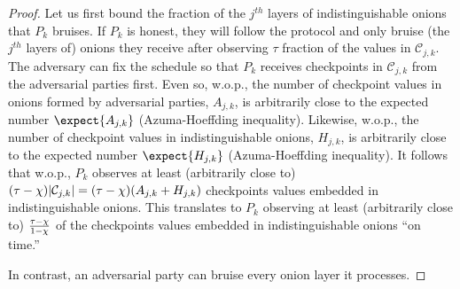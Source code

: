 \documentclass[runningheads,a4paper]{llncs}
\begin{document}
\begin{proof}
Let us first bound the fraction of the $j^\mathit{th}$ layers of indistinguishable onions that $P_k$ bruises. 
If $P_k$ is honest, they will follow the protocol and only bruise (the $j^\mathit{th}$ layers of) onions they receive after observing $\tau$ fraction of the values in $\mathcal{C}_{j, k}$. 
The adversary can fix the schedule so that $P_k$ receives checkpoints in $\mathcal{C}_{j, k}$ from the adversarial parties first. 
Even so, %
w.o.p., 
the number of checkpoint values in onions formed by adversarial parties, $A_{j, k}$, is arbitrarily close to the expected number $\expect{A_{j, k}}$ (Azuma-Hoeffding inequality). 
Likewise, w.o.p., 
the number of checkpoint values in indistinguishable onions, $H_{j, k}$, is arbitrarily close to the expected number $\expect{H_{j, k}}$ (Azuma-Hoeffding inequality).
It follows that 
w.o.p., $P_k$ observes at least (arbitrarily close to) $(\tau-\chi)|\mathcal{C}_{j,k}| = (\tau-\chi)(A_{j, k} + H_{j, k})$ checkpoints values embedded in indistinguishable onions. This translates to $P_k$ observing at least (arbitrarily close to) $\frac{\tau-\chi}{1-\chi}$ of the checkpoints values embedded in indistinguishable onions ``on time.'' 

In contrast, an adversarial party can bruise every onion layer it processes. 


\end{proof}
\end{document}
